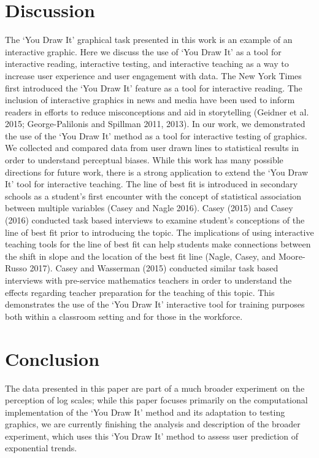 \documentclass[
]{jds}
\begin{document}
\hypertarget{discussion}{%
\section{Discussion}\label{discussion}}

The `You Draw It' graphical task presented in this work is an example of
an interactive graphic. Here we discuss the use of `You Draw It' as a
tool for interactive reading, interactive testing, and interactive
teaching as a way to increase user experience and user engagement with
data. The New York Times first introduced the `You Draw It' feature as a
tool for interactive reading. The inclusion of interactive graphics in
news and media have been used to inform readers in efforts to reduce
misconceptions and aid in storytelling (Geidner et al. 2015;
George-Palilonis and Spillman 2011, 2013). In our work, we demonstrated
the use of the `You Draw It' method as a tool for interactive testing of
graphics. We collected and compared data from user drawn lines to
statistical results in order to understand perceptual biases. While this
work has many possible directions for future work, there is a strong
application to extend the `You Draw It' tool for interactive teaching.
The line of best fit is introduced in secondary schools as a student's
first encounter with the concept of statistical association between
multiple variables (Casey and Nagle 2016). Casey (2015) and Casey (2016)
conducted task based interviews to examine student's conceptions of the
line of best fit prior to introducing the topic. The implications of
using interactive teaching tools for the line of best fit can help
students make connections between the shift in slope and the location of
the best fit line (Nagle, Casey, and Moore-Russo 2017). Casey and
Wasserman (2015) conducted similar task based interviews with
pre-service mathematics teachers in order to understand the effects
regarding teacher preparation for the teaching of this topic. This
demonstrates the use of the `You Draw It' interactive tool for training
purposes both within a classroom setting and for those in the workforce.

\hypertarget{conclusion}{%
\section{Conclusion}\label{conclusion}}

The data presented in this paper are part of a much broader experiment
on the perception of log scales; while this paper focuses primarily on
the computational implementation of the `You Draw It' method and its
adaptation to testing graphics, we are currently finishing the analysis
and description of the broader experiment, which uses this `You Draw It'
method to assess user prediction of exponential trends.
\end{document}
